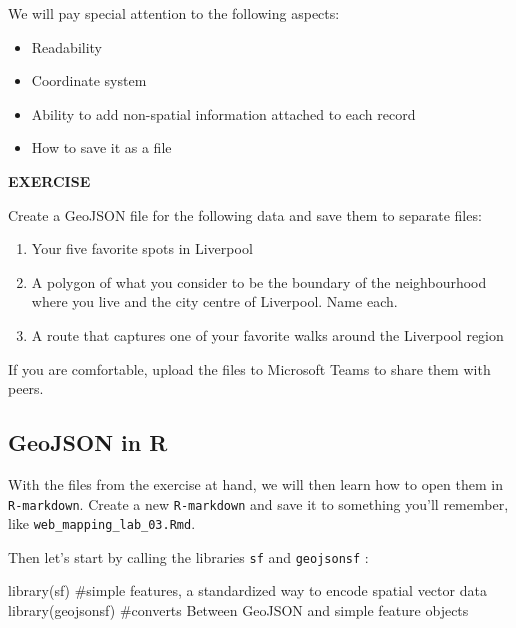 \documentclass[
  letterpaper,
  DIV=11,
  numbers=noendperiod]{scrreprt}
\newenvironment{Shaded}{\begin{snugshade}}{\end{snugshade}}
\newcommand{\CommentTok}[1]{\textcolor[rgb]{0.37,0.37,0.37}{#1}}
\newcommand{\FunctionTok}[1]{\textcolor[rgb]{0.28,0.35,0.67}{#1}}
\newcommand{\NormalTok}[1]{\textcolor[rgb]{0.00,0.23,0.31}{#1}}
\providecommand{\tightlist}{%
  \setlength{\itemsep}{0pt}\setlength{\parskip}{0pt}}\usepackage{longtable,booktabs,array}
\begin{document}
We will pay special attention to the following aspects:

\begin{itemize}
\tightlist
\item
  Readability
\item
  Coordinate system
\item
  Ability to add non-spatial information attached to each record
\item
  How to save it as a file
\end{itemize}

\textbf{EXERCISE}

Create a GeoJSON file for the following data and save them to separate
files:

\begin{enumerate}
\def\labelenumi{\arabic{enumi}.}
\item
  Your five favorite spots in Liverpool
\item
  A polygon of what you consider to be the boundary of the neighbourhood
  where you live and the city centre of Liverpool. Name each.
\item
  A route that captures one of your favorite walks around the Liverpool
  region
\end{enumerate}

If you are comfortable, upload the files to Microsoft Teams to share
them with peers.

\hypertarget{geojson-in-r}{%
\subsection{GeoJSON in R}\label{geojson-in-r}}

With the files from the exercise at hand, we will then learn how to open
them in \texttt{R-markdown}. Create a new \texttt{R-markdown} and save
it to something you'll remember, like
\texttt{web\_mapping\_lab\_03.Rmd}.

Then let's start by calling the libraries \texttt{sf} and
\texttt{geojsonsf} :

\begin{Shaded}
\begin{Highlighting}[]
\FunctionTok{library}\NormalTok{(sf) }\CommentTok{\#simple features, a standardized way to encode spatial vector data}
\FunctionTok{library}\NormalTok{(geojsonsf) }\CommentTok{\#converts Between GeoJSON and simple feature objects}
\end{Highlighting}
\end{Shaded}
\end{document}
